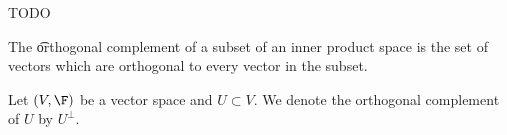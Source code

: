

TODO


The \t{orthogonal complement} of a subset of an inner product space is the set of vectors which are orthogonal to every vector in the subset.


Let $(V, \F)$ be a vector space and $U \subset V$.
We denote the orthogonal complement of $U$ by $U^{\perp}$.

\blankpage
